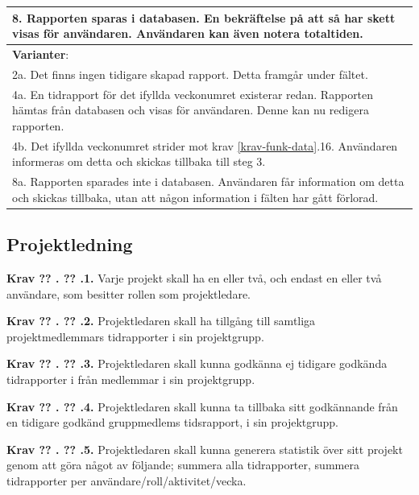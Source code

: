 \documentclass[a4paper]{article}
\newcommand\getcurrentref[1]{%
 \ifnumequal{\value{#1}}{0}
  {??}
  {\the\value{#1}}%
}
\newcommand\requirement[2]{
	\numberedrow{Krav}{#1}{#2}
}
\newcommand\numberedrow[3]{
	\noindent
	\textbf{#1 \getcurrentref{section}.\getcurrentref{subsection}.#2.} #3
	
}
\begin{document}
\begin{table}[H]
\begin{tabular}{ | p{2cm} p{11cm} | }
	\multicolumn{2}{|p{13cm}|}{8. Rapporten sparas i databasen. En bekräftelse på att så har skett visas för användaren. Användaren kan även notera totaltiden.}\\ \hline
    \multicolumn{2}{|p{13cm}|}{\textbf{Varianter}: }\\
	\multicolumn{2}{|p{13cm}|}{2a. Det finns ingen tidigare skapad rapport. Detta framgår under fältet. }\\
	\multicolumn{2}{|p{13cm}|}{4a. En tidrapport för det ifyllda veckonumret existerar redan. Rapporten hämtas från 		databasen och visas för användaren. Denne kan nu redigera rapporten. }\\
	\multicolumn{2}{|p{13cm}|}{4b. Det ifyllda veckonumret strider mot krav \ref{krav-funk-data}.16. Användaren informeras om detta och skickas tillbaka till steg 3. }\\
	\multicolumn{2}{|p{13cm}|}{8a. Rapporten sparades inte i databasen. Användaren får information om detta och skickas tillbaka, utan att någon information i fälten har gått förlorad.}\\
    \hline
\end{tabular}
\end{table}




\subsection{Projektledning}
\label{krav-funk-proj}
\requirement{1}{Varje projekt skall ha en eller två, och endast en eller två användare, som besitter rollen som projektledare.}
\requirement{2}{Projektledaren skall ha tillgång till samtliga projektmedlemmars tidrapporter i sin projektgrupp.}
\requirement{3}{Projektledaren skall kunna godkänna ej tidigare godkända tidrapporter i från medlemmar i sin projektgrupp.}
\requirement{4}{Projektledaren skall kunna ta tillbaka sitt godkännande från en tidigare godkänd gruppmedlems tidsrapport, i sin projektgrupp.}
\requirement{5}{Projektledaren skall kunna generera statistik över sitt projekt genom att göra något av följande; summera alla tidrapporter, summera tidrapporter per användare/roll/aktivitet/vecka.}

\end{document}
